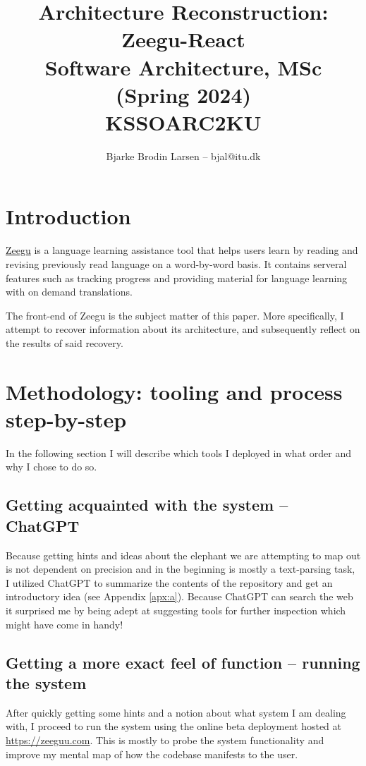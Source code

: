 \documentclass{article}
\title{Architecture Reconstruction: Zeegu-React \\ \normalsize Software Architecture, MSc (Spring 2024) \\ KSSOARC2KU \\}
\author{Bjarke Brodin Larsen -- bjal@itu.dk}
\begin{document}
\maketitle
\tableofcontents

\section{Introduction}

\href{https://zeeguu.com}{Zeegu} is a language learning assistance tool
that helps users learn by reading and revising previously read language on a word-by-word basis.
It contains serveral features such as tracking progress and providing material for language learning
with on demand translations.

\vspace*{1em}\noindent
The front-end of Zeegu is the subject matter of this paper.
More specifically, I attempt to recover information about its architecture,
and subsequently reflect on the results of said recovery.

\section{Methodology: tooling and process step-by-step}

In the following section I will describe which tools I 
deployed in what order and why I chose to do so.

\subsection{Getting acquainted with the system -- ChatGPT}

Because getting hints and ideas about the elephant we are attempting to 
map out is not dependent on precision and in the beginning is mostly a
text-parsing task, I utilized ChatGPT\cite{gpt4} to summarize the
contents of the repository and get an introductory idea 
(see Appendix \ref{apx:a}).
Because ChatGPT can search the web it surprised me by being adept at 
suggesting tools for further inspection which might have come in handy!

\subsection{Getting a more exact feel of function -- running the system}

After quickly getting some hints and a notion about what system I am dealing with,
I proceed to run the system using the online beta deployment hosted at \href{https://zeeguu.com}{https://zeeguu.com}.
This is mostly to probe the system functionality and improve my mental map of how the codebase manifests to the user.
\end{document}
